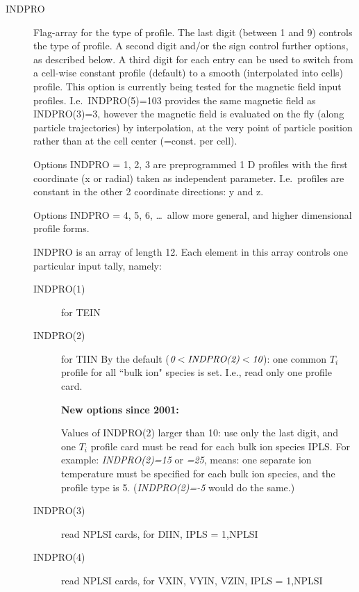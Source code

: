 \begin{description}
  \item[INDPRO] Flag-array for the type of profile.
        The last digit (between 1 and 9) controls the type of profile.
        A second digit and/or the sign control further options, as described below.
        A third digit for each entry can be used to switch from a cell-wise constant
        profile (default) to a smooth (interpolated into cells) profile.
        This option is currently being tested for the magnetic field input profiles.
        I.e.\ INDPRO(5)=103 provides the same magnetic field as INDPRO(3)=3, however
        the magnetic field is evaluated on the fly (along particle trajectories) by
        interpolation, at the very point of particle position rather than at the cell
        center (=const.
        per cell).

        Options INDPRO = 1, 2, 3 are preprogrammed 1 D profiles with the first
        coordinate (x or radial) taken as independent parameter.
        I.e.\ profiles are constant in the other 2 coordinate directions: y and z.

        Options INDPRO = 4, 5, 6, \dots\ allow more general, and higher dimensional
        profile forms.

        INDPRO is an array of length 12.
        Each element in this array controls one particular input tally, namely:
        \begin{description}
          \item[INDPRO(1)]  for TEIN 

          \item[INDPRO(2)]  for TIIN By the default ($\emph{0} < \emph{INDPRO(2)} <
                  \emph{10}$): one common $T_i$ profile for all ``bulk ion" species is set.
                I.e., read only one profile card.

                \textbf{New options since 2001:} 

                Values of INDPRO(2) larger than 10: use only the last digit, and one $T_i$
                profile card must be read for each bulk ion species IPLS.
                For example: \emph{INDPRO(2)=15} or \emph{=25}, means: one separate ion
                temperature must be specified for each bulk ion species, and the profile type
                is 5.
                (\emph{INDPRO(2)=-5} would do the same.)
          \item[INDPRO(3)] read NPLSI cards, for DIIN, IPLS = 1,NPLSI 

          \item[INDPRO(4)] read NPLSI cards, for VXIN, VYIN, VZIN, IPLS = 1,NPLSI


\end{description}
\end{description}
